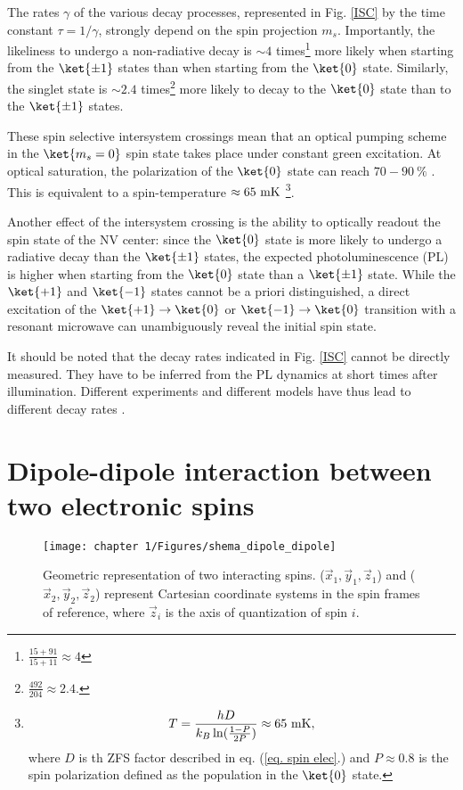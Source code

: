 \documentclass[a4paper, 11pt]{report}
\begin{document}
The rates $\gamma$ of the various decay processes, represented in Fig. \ref{ISC} by the time constant $\tau=1/\gamma$, strongly depend on the spin projection $m_s$. Importantly, the likeliness to undergo a non-radiative decay is $\sim 4$ times\footnote{$\frac{15+91}{15+11}\approx 4$} more likely when starting from the $\ket{\pm 1}$ states than when starting from the $\ket{0}$ state. Similarly, the singlet state is $\sim 2.4$ times\footnote{$\frac{492}{204} \approx 2.4$.} more likely to decay to the $\ket{0}$ state than to the $\ket{\pm 1}$ states.

These spin selective intersystem crossings mean that an optical pumping scheme in the $\ket{m_s=0}$ spin state takes place under constant green excitation. At optical saturation, the polarization of the $\ket{0}$ state can reach $70-90\ \%$ \citep{gupta2016efficient}. This is equivalent to a spin-temperature $\approx 65\ \rm mK$ \footnote{\begin{equation*}
T=\frac{h D}{k_B \ln (\frac{1-P}{2P})} \approx 65\ \rm mK,
\end{equation*}
where $D$ is th ZFS factor described in eq. (\ref{eq. spin elec}.) and $P\approx 0.8$ is the spin polarization defined as the population in the $\ket{0}$ state.}.

Another effect of the intersystem crossing is the ability to optically readout the spin state of the NV center: since the $\ket{0}$ state is more likely to undergo a radiative decay than the $\ket{\pm 1}$ states, the expected photoluminescence (PL) is higher when starting from the $\ket{0}$ state than a $\ket{\pm 1}$ state. While the $\ket{+1}$ and $\ket{-1}$ states cannot be a priori distinguished, a direct excitation of the $\ket{+1} \to \ket{0}$ or $\ket{-1} \to \ket{0}$ transition with a resonant microwave can unambiguously reveal the initial spin state.

It should be noted that the decay rates indicated in Fig. \ref{ISC} cannot be directly measured. They have to be inferred from the PL dynamics at short times after illumination. Different experiments and different models have thus lead to different decay rates \citep{duarte2021effect}. 

\section{Dipole-dipole interaction between two electronic spins}

\begin{figure}[h!]
\centering
\texttt{[image: chapter 1/Figures/shema\_dipole\_dipole]}
\caption{Geometric representation of two interacting spins. ($\vec{x}_1,\vec{y}_1,\vec{z}_1$) and ($\vec{x}_2,\vec{y}_2,\vec{z}_2$) represent Cartesian coordinate systems in the spin frames of reference, where $\vec{z}_i$ is the axis of quantization of spin $i$.} 
\label{dipole-dipole}
\end{figure}
\end{document}

